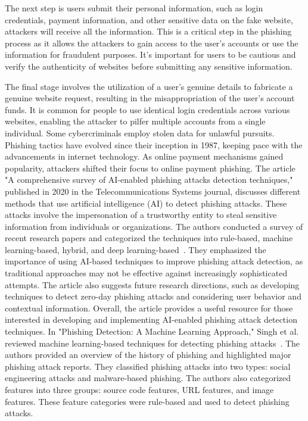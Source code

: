 \documentclass[final]{cvpr}
\begin{document}
The next step is users submit their personal information, such as login credentials, payment information, and other sensitive data on the fake website, attackers will receive all the information. This is a critical step in the phishing process as it allows the attackers to gain access to the user's accounts or use the information for fraudulent purposes. It's important for users to be cautious and verify the authenticity of websites before submitting any sensitive information.

The final stage involves the utilization of a user's genuine details to fabricate a genuine website request, resulting in the misappropriation of the user's account funds. It is common for people to use identical login credentials across various websites, enabling the attacker to pilfer multiple accounts from a single individual. Some cybercriminals employ stolen data for unlawful pursuits. Phishing tactics have evolved since their inception in 1987, keeping pace with the advancements in internet technology. As online payment mechanisms gained popularity, attackers shifted their focus to online payment phishing. The article "A comprehensive survey of AI-enabled phishing attacks detection techniques," published in 2020 in the Telecommunications Systems journal, discusses different methods that use artificial intelligence (AI) to detect phishing attacks. These attacks involve the impersonation of a trustworthy entity to steal sensitive information from individuals or organizations. The authors conducted a survey of recent research papers and categorized the techniques into rule-based, machine learning-based, hybrid, and deep learning-based~\cite{basit2020comprehensive}. They emphasized the importance of using AI-based techniques to improve phishing attack detection, as traditional approaches may not be effective against increasingly sophisticated attempts. The article also suggests future research directions, such as developing techniques to detect zero-day phishing attacks and considering user behavior and contextual information. Overall, the article provides a useful resource for those interested in developing and implementing AI-enabled phishing attack detection techniques. In "Phishing Detection: A Machine Learning Approach," Singh et al. reviewed machine learning-based techniques for detecting phishing attacks~\cite{singh2020phishing}. The authors provided an overview of the history of phishing and highlighted major phishing attack reports. They classified phishing attacks into two types: social engineering attacks and malware-based phishing. The authors also categorized features into three groups: source code features, URL features, and image features. These feature categories were rule-based and used to detect phishing attacks.
\end{document}
